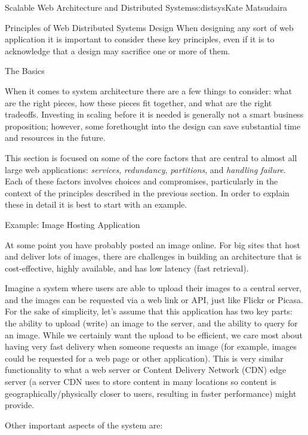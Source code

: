 \begin{aosachapter}{Scalable Web Architecture and Distributed Systems}{s:distsys}{Kate Matsudaira}
\begin{aosasect1}{Principles of Web Distributed Systems Design}
When designing any sort of web application it is
important to consider these key principles, even if it is to
acknowledge that a design may sacrifice one or more of them.

\end{aosasect1}

\begin{aosasect1}{The Basics}

When it comes to system architecture there are a few things to
consider: what are the right pieces, how these pieces fit together,
and what are the right tradeoffs. 
Investing in scaling before it is needed is generally not a smart
business proposition; however, some forethought into the design can
save substantial time and resources in the future.

This section is focused on some of the core factors that are central to
almost all large web applications: \emph{services},
\emph{redundancy}, \emph{partitions}, and \emph{handling
failure}. Each of these factors involves choices and compromises,
particularly in the context of the principles described in the
previous section. In order to explain these in detail it is
best to start with an example.

\begin{aosasect2}{Example: Image Hosting Application}

At some point you have probably posted an image online. For big
sites that host and deliver lots of images, there are 
challenges in building an architecture that is cost-effective, highly
available, and has low latency (fast retrieval).

Imagine a system where users are able to upload their images to a
central server, and the images can be requested via a web link or
API, just like Flickr or Picasa. For the sake of simplicity, let's
assume that this application has two key parts: the ability to upload
(write) an image to the server, and the ability to query for an
image. While we certainly want the upload to be efficient, we care 
most about having very fast delivery when someone requests an image
(for example, images could be requested for a web page or other
application). This is very similar functionality to what a web server
or Content Delivery Network (CDN) edge server (a server
CDN uses to store content in many locations so content 
is geographically/physically closer to users, resulting in faster
performance) might provide.

Other important aspects of the system are:


\end{aosasect2}
\end{aosasect1}
\end{aosachapter}
